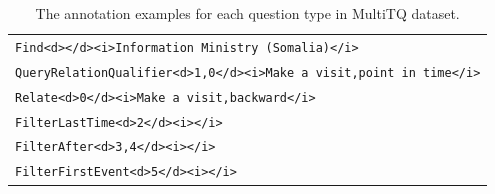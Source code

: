 \documentclass[10pt, a4paper]{article}
\begin{document}
\begin{table}[ht]
{\begin{tabular}{ p{} }
        \texttt{Find<d></d><i>Information Ministry (Somalia)</i>}\\
        \texttt{QueryRelationQualifier<d>1,0</d><i>Make a visit,point in time</i>}\\
        \texttt{Relate<d>0</d><i>Make a visit,backward</i>}\\
        \texttt{FilterLastTime<d>2</d><i></i>}\\
        \texttt{FilterAfter<d>3,4</d><i></i>}\\
        \texttt{FilterFirstEvent<d>5</d><i></i>}\\
        \bottomrule
        \end{tabular}
        }
 \caption{The annotation examples for each question type in MultiTQ dataset.}
    \label{table:annotation}
\end{table}
\end{document}
